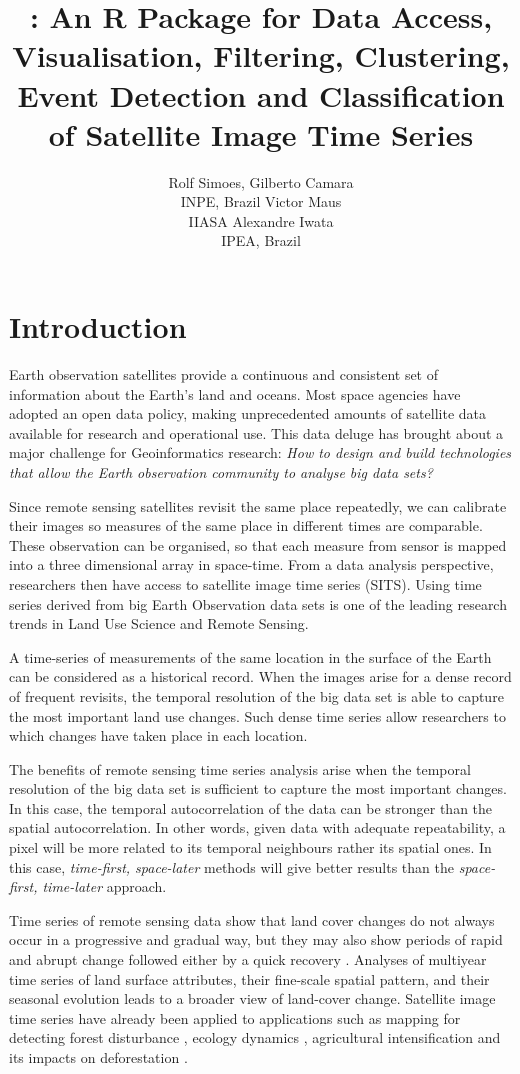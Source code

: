 \documentclass[article]{jss}
\author{
Rolf Simoes, Gilberto Camara\\INPE, Brazil \And Victor Maus\\IIASA \And Alexandre Iwata\\IPEA, Brazil
}
\title{\pkg{SITS}: An R Package for Data Access, Visualisation, Filtering,
Clustering, Event Detection and Classification of Satellite Image Time
Series}
\begin{document}
\section{Introduction}\label{introduction}

Earth observation satellites provide a continuous and consistent set of
information about the Earth's land and oceans. Most space agencies have
adopted an open data policy, making unprecedented amounts of satellite
data available for research and operational use. This data deluge has
brought about a major challenge for Geoinformatics research:
\textit{How to design and build technologies that allow the Earth observation community to analyse big data sets?}

Since remote sensing satellites revisit the same place repeatedly, we
can calibrate their images so measures of the same place in different
times are comparable. These observation can be organised, so that each
measure from sensor is mapped into a three dimensional array in
space-time. From a data analysis perspective, researchers then have
access to satellite image time series (SITS). Using time series derived
from big Earth Observation data sets is one of the leading research
trends in Land Use Science and Remote Sensing.

A time-series of measurements of the same location in the surface of the
Earth can be considered as a historical record. When the images arise
for a dense record of frequent revisits, the temporal resolution of the
big data set is able to capture the most important land use changes.
Such dense time series allow researchers to which changes have taken
place in each location.

The benefits of remote sensing time series analysis arise when the
temporal resolution of the big data set is sufficient to capture the
most important changes. In this case, the temporal autocorrelation of
the data can be stronger than the spatial autocorrelation. In other
words, given data with adequate repeatability, a pixel will be more
related to its temporal neighbours rather its spatial ones. In this
case, \textit{time-first, space-later} methods will give better results
than the \textit{space-first, time-later} approach.

Time series of remote sensing data show that land cover changes do not
always occur in a progressive and gradual way, but they may also show
periods of rapid and abrupt change followed either by a quick recovery
\citep{Lambin2006}. Analyses of multiyear time series of land surface
attributes, their fine-scale spatial pattern, and their seasonal
evolution leads to a broader view of land-cover change. Satellite image
time series have already been applied to applications such as mapping
for detecting forest disturbance \citep{Kennedy2010}, ecology dynamics
\citep{Pasquarella2016}, agricultural intensification
\citep{Galford2008} and its impacts on deforestation \citep{Arvor2012}.
\end{document}
